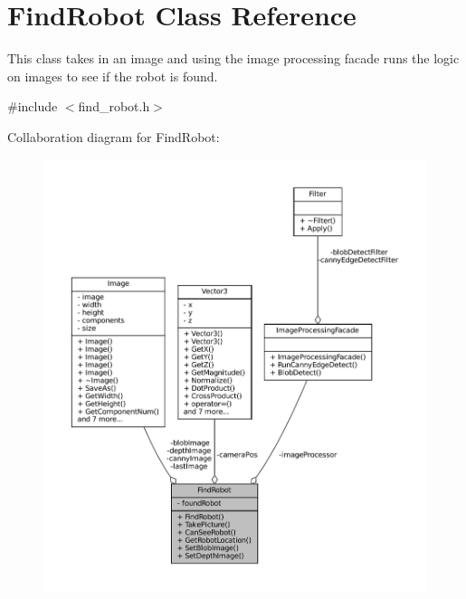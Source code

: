 \hypertarget{classFindRobot}{}\section{Find\+Robot Class Reference}
\label{classFindRobot}


This class takes in an image and using the image processing facade runs the logic on images to see if the robot is found.  




{\ttfamily \#include $<$find\+\_\+robot.\+h$>$}



Collaboration diagram for Find\+Robot\+:\nopagebreak
\begin{figure}[H]
\begin{center}
\leavevmode
\includegraphics[width=350pt]{classFindRobot__coll__graph}
\end{center}
\end{figure}
